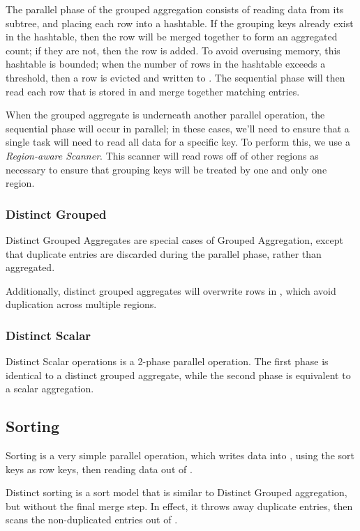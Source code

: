 The parallel phase of the grouped aggregation consists of reading data from its subtree, and placing each row into a hashtable. If the grouping keys already exist in the hashtable, then the row will be merged together to form an aggregated count; if they are not, then the row is added. To avoid overusing memory, this hashtable is bounded; when the number of rows in the hashtable exceeds a threshold, then a row is evicted and written to \temp. The sequential phase will then read each row that is stored in \temp and merge together matching entries.

When the grouped aggregate is underneath another parallel operation, the sequential phase will occur in parallel; in these cases, we'll need to ensure that a single task will need to read all data for a specific key. To perform this, we use a \emph{Region-aware Scanner}. This scanner will read rows off of other regions as necessary to ensure that grouping keys will be treated by one and only one region.

\subsubsection{Distinct Grouped}
Distinct Grouped Aggregates are special cases of Grouped Aggregation, except that duplicate entries are discarded during the parallel phase, rather than aggregated.

Additionally, distinct grouped aggregates will overwrite rows in \temp, which avoid duplication across multiple regions.

\subsubsection{Distinct Scalar}
Distinct Scalar operations is a 2-phase parallel operation. The first phase is identical to a distinct grouped aggregate, while the second phase is equivalent to a scalar aggregation.

\subsection{Sorting}
Sorting is a very simple parallel operation, which writes data into \temp, using the sort keys as row keys, then reading data out of \temp.

Distinct sorting is a sort model that is similar to Distinct Grouped aggregation, but without the final merge step. In effect, it throws away duplicate entries, then scans the non-duplicated entries out of \temp.

